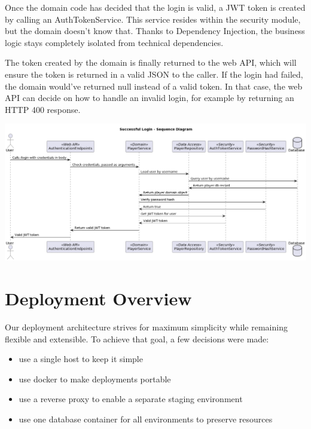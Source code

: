 Once the domain code has decided that the login is valid, a JWT token is created by calling an AuthTokenService.
This service resides within the security module, but the domain doesn't know that.
Thanks to Dependency Injection, the business logic stays completely isolated from technical dependencies.

The token created by the domain is finally returned to the web API, which will ensure the token is returned in a valid JSON to the caller.
If the login had failed, the domain would've returned null instead of a valid token.
In that case, the web API can decide on how to handle an invalid login, for example by returning an HTTP 400 response.

\includegraphics[width=\textwidth]{resources/diagrams/login-sequence}

\newpage

\section{Deployment Overview}
\label{sec:architecture_deployment}
Our deployment architecture strives for maximum simplicity while remaining flexible and extensible.
To achieve that goal, a few decisions were made:
\begin{itemize}
    \item use a single host to keep it simple
    \item use docker to make deployments portable
    \item use a reverse proxy to enable a separate staging environment
    \item use one database container for all environments to preserve resources
\end{itemize}

